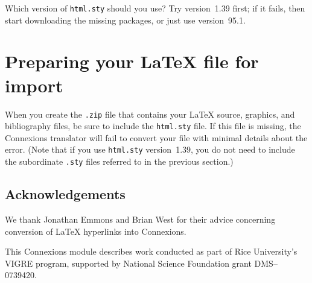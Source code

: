 \documentclass[11pt]{article}
\begin{document}
Which version of \verb|html.sty| should you use?
Try version~1.39 first; if it fails, then start
downloading the missing packages, or just use version~95.1.

\section{Preparing your LaTeX file for import}

When you create the \verb|.zip| file that contains your LaTeX source,
graphics, and bibliography files, be sure to include the \verb|html.sty|
file.  If this file is missing, the Connexions translator will fail to 
convert your file with minimal details about the error.
(Note that if you use \verb|html.sty| version~1.39, you do not need to 
include the subordinate \verb|.sty| files referred to in the previous section.)

\subsection{Acknowledgements}
We thank Jonathan Emmons and Brian West for their advice concerning
conversion of LaTeX hyperlinks into Connexions. 

This Connexions module describes work conducted as part of Rice 
University's VIGRE program, supported by National Science Foundation
grant DMS--0739420.  
\end{document}

